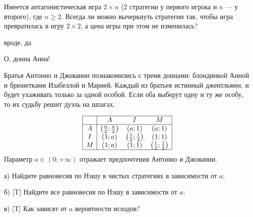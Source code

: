 \begin{problem}

Имеется антагонистическая игра $2\times n$ (2 стратегии у первого игрока и $n$ — у второго), где $n\ge 2$. Всегда ли можно вычеркнуть стратегии так, чтобы игра превратилась в игру $2\times 2$, а цена игры при этом не изменилась?



\begin{sol}
 вроде, да
\end{sol}
\end{problem}



\begin{problem}
 О, донна Анна!\par
Братья Антонио и Джованни познакомились с тремя доннами: блондинкой Анной и брюнетками Изабеллой и Марией. Каждый из братьев истинный джентльмен, и будет ухаживать только за одной особой. Если оба выберут одну и ту же особу, то их судьбу решит дуэль на шпагах.

\[\begin{array}{|c|ccc|}  \hline {} & {A} & {I} & {M} \\  \hline {A} & {\left(\frac{a}{2} ;\frac{a}{2} \right)} & {\left(a;1\right)} & {\left(a;1\right)} \\ {I} & {\left(1;a\right)} & {\left(\frac{1}{2} ;\frac{1}{2} \right)} & {\left(1;1\right)} \\ {M} & {\left(1;a\right)} & {\left(1;1\right)} & {\left(\frac{1}{2} ;\frac{1}{2} \right)} \\  \hline  \end{array}\]
Параметр  $a\in \left(0;+\infty \right)$  отражает предпочтения Антонио и Джованни.\par
а)	Найдите равновесия по Нэшу в чистых стратегиях в зависимости от  $a$;\par
б)	$[$T$]$ Найдите все равновесия по Нэшу в зависимости от  $a$; \par
в)	$[$T$]$ Как зависят от  $a$  вероятности исходов?



\begin{sol}

\end{sol}
\end{problem}




